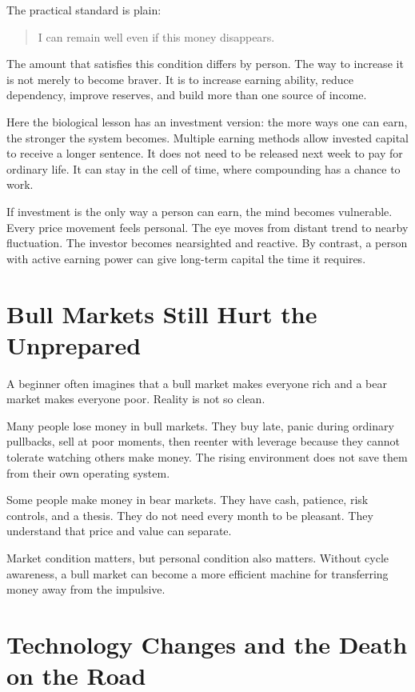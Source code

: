 The practical standard is plain:

\begin{quote}
I can remain well even if this money disappears.
\end{quote}

The amount that satisfies this condition differs by person. The way to increase it is not merely to become braver. It is to increase earning ability, reduce dependency, improve reserves, and build more than one source of income.

Here the biological lesson has an investment version: the more ways one can earn, the stronger the system becomes. Multiple earning methods allow invested capital to receive a longer sentence. It does not need to be released next week to pay for ordinary life. It can stay in the cell of time, where compounding has a chance to work.

If investment is the only way a person can earn, the mind becomes vulnerable. Every price movement feels personal. The eye moves from distant trend to nearby fluctuation. The investor becomes nearsighted and reactive. By contrast, a person with active earning power can give long-term capital the time it requires.

\section*{Bull Markets Still Hurt the Unprepared}

A beginner often imagines that a bull market makes everyone rich and a bear market makes everyone poor. Reality is not so clean.

Many people lose money in bull markets. They buy late, panic during ordinary pullbacks, sell at poor moments, then reenter with leverage because they cannot tolerate watching others make money. The rising environment does not save them from their own operating system.

Some people make money in bear markets. They have cash, patience, risk controls, and a thesis. They do not need every month to be pleasant. They understand that price and value can separate.

Market condition matters, but personal condition also matters. Without cycle awareness, a bull market can become a more efficient machine for transferring money away from the impulsive.

\section*{Technology Changes and the Death on the Road}

